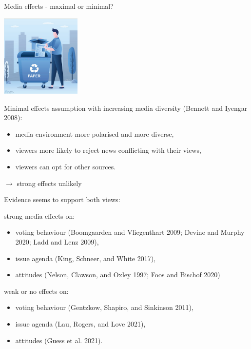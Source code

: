 \documentclass[
  ignorenonframetext,
]{beamer}
\providecommand{\tightlist}{%
  \setlength{\itemsep}{0pt}\setlength{\parskip}{0pt}}
\begin{document}
\begin{frame}[allowframebreaks]{Media effects - maximal or minimal?}
\framebreak

\center

\includegraphics[width=0.3\textwidth,height=\textheight]{vis/mineff.png}

\flushleft

Minimal effects assumption with increasing media diversity (Bennett and
Iyengar 2008):

\begin{itemize}
\tightlist
\item
  media environment more polarised and more diverse,
\item
  viewers more likely to reject news conflicting with their views,
\item
  viewers can opt for other sources.
\end{itemize}

\(\rightarrow\) strong effects unlikely

\framebreak

Evidence seems to support both views:
\end{frame}

\begin{frame}{strong media effects on:}
\protect\hypertarget{strong-media-effects-on}{}
\begin{itemize}
\tightlist
\item
  voting behaviour (Boomgaarden and Vliegenthart 2009; Devine and Murphy
  2020; Ladd and Lenz 2009),
\item
  issue agenda (King, Schneer, and White 2017),
\item
  attitudes (Nelson, Clawson, and Oxley 1997; Foos and Bischof 2020)
\end{itemize}
\end{frame}

\begin{frame}{weak or no effects on:}
\protect\hypertarget{weak-or-no-effects-on}{}
\begin{itemize}
\tightlist
\item
  voting behaviour (Gentzkow, Shapiro, and Sinkinson 2011),
\item
  issue agenda (Lau, Rogers, and Love 2021),
\item
  attitudes (Guess et al. 2021).
\end{itemize}
\end{frame}
\end{document}
